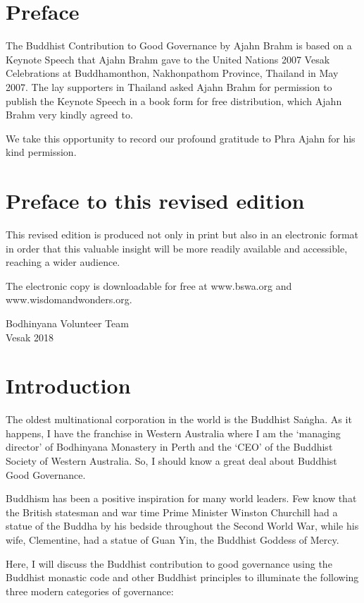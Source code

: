 \documentclass[11pt, openany]{book}
\begin{document}
\chapter*{Preface}

The Buddhist Contribution to Good Governance by Ajahn Brahm is based on a Keynote Speech that Ajahn Brahm gave to the United Nations 2007 Vesak Celebrations at Buddhamonthon, Nakhonpathom Province, Thailand in May 2007. The lay supporters in Thailand asked Ajahn Brahm for permission to publish the Keynote Speech in a book form for free distribution, which Ajahn Brahm very kindly agreed to.

We take this opportunity to record our profound gratitude to Phra Ajahn for his kind permission.

\chapter*{Preface to this revised edition}

This revised edition is produced not only in print but also in an electronic format in order that this valuable insight will be more readily available and accessible, reaching a wider audience.

The electronic copy is downloadable for free at www.bswa.org and www.wisdomandwonders.org.

\bigskip

\noindent Bodhinyana Volunteer Team\\
\noindent Vesak 2018

\chapter*{Introduction}

The oldest multinational corporation in the world is the Buddhist Saṅgha. As it happens, I have the franchise in Western Australia where I am the ‘managing director’ of Bodhinyana Monastery in Perth and the ‘CEO’ of the Buddhist Society of Western Australia. So, I should know a great deal about Buddhist Good Governance.

Buddhism has been a positive inspiration for many world leaders. Few know that the British statesman and war time Prime Minister Winston Churchill had a statue of the Buddha by his bedside throughout the Second World War, while his wife, Clementine, had a statue of Guan Yin, the Buddhist Goddess of Mercy.

Here, I will discuss the Buddhist contribution to good governance using the Buddhist monastic code and other Buddhist principles to illuminate the following three modern categories of governance:
\end{document}
